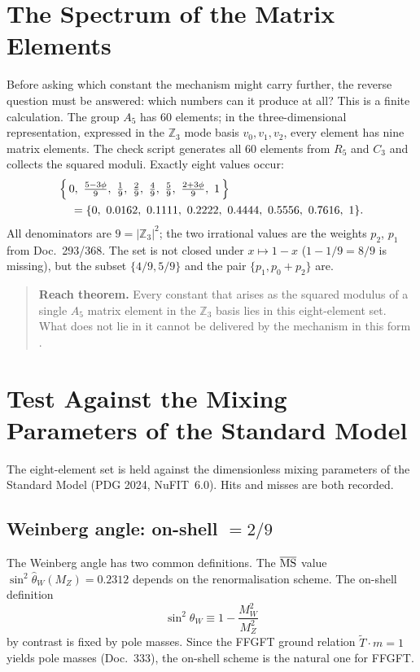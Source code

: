 \section{The Spectrum of the Matrix Elements \BM}
\label{sec:spektrum}

Before asking which constant the mechanism might carry further, the reverse
question must be answered: which numbers can it produce at all? This is a
finite calculation. The group $A_5$ has 60 elements; in the
three-dimensional representation, expressed in the $\mathbb Z_3$ mode basis
$v_0,v_1,v_2$, every element has nine matrix elements. The check script
generates all 60 elements from $R_5$ and $C_3$ and collects the squared
moduli. Exactly eight values occur:
\begin{align*}
  &\Bigl\{\,0,\ \tfrac{5-3\phi}{9},\ \tfrac19,\ \tfrac29,\ \tfrac49,\
  \tfrac59,\ \tfrac{2+3\phi}{9},\ 1\,\Bigr\} \\
  &\quad = \{0,\ 0.0162,\ 0.1111,\ 0.2222,\ 0.4444,\ 0.5556,\ 0.7616,\ 1\}.
\end{align*}
All denominators are $9 = |\mathbb Z_3|^2$; the two irrational values are the
weights $p_2$, $p_1$ from Doc.~293/368. The set is not closed under
$x\mapsto 1-x$ ($1-1/9 = 8/9$ is missing), but the subset $\{4/9,5/9\}$ and
the pair $\{p_1, p_0+p_2\}$ are.

\begin{quote}
\textbf{Reach theorem.} Every constant that arises as the squared modulus of
a single $A_5$ matrix element in the $\mathbb Z_3$ basis lies in this
eight-element set. What does not lie in it cannot be delivered by the
mechanism in this form \BM.
\end{quote}

\section{Test Against the Mixing Parameters of the Standard Model}
\label{sec:pruefung}

The eight-element set is held against the dimensionless mixing parameters of
the Standard Model (PDG 2024, NuFIT~6.0). Hits and misses are both recorded.

\subsection{Weinberg angle: on-shell \texorpdfstring{$=2/9$}{= 2/9} \KM}
\label{sec:weinberg}

The Weinberg angle has two common definitions. The $\overline{\rm MS}$ value
$\sin^2\hat\theta_W(M_Z) = 0.2312$ depends on the renormalisation scheme. The
on-shell definition
\[
  \sin^2\theta_W \equiv 1 - \frac{M_W^2}{M_Z^2}
\]
by contrast is fixed by pole masses. Since the FFGFT ground relation
$\tilde T\cdot m = 1$ yields pole masses (Doc.~333), the on-shell scheme is
the natural one for FFGFT.

